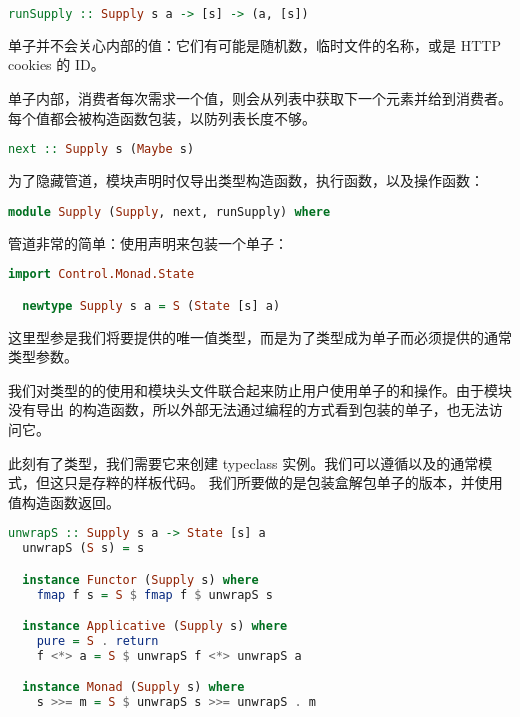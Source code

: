 \documentclass[./main.tex]{subfiles}
\begin{document}
\begin{lstlisting}[language=Haskell]
  runSupply :: Supply s a -> [s] -> (a, [s])
\end{lstlisting}

单子并不会关心内部的值：它们有可能是随机数，临时文件的名称，或是 HTTP cookies 的 ID。

单子内部，消费者每次需求一个值，则会从列表中获取下一个元素并给到消费者。每个值都会被构造函数包装，以防列表长度不够。

\begin{lstlisting}[language=Haskell]
  next :: Supply s (Maybe s)
\end{lstlisting}

为了隐藏管道，模块声明时仅导出类型构造函数，执行函数，以及操作函数：

\begin{lstlisting}[language=Haskell]
  module Supply (Supply, next, runSupply) where
\end{lstlisting}

管道非常的简单：使用声明来包装一个单子：

\begin{lstlisting}[language=Haskell]
  import Control.Monad.State

  newtype Supply s a = S (State [s] a)
\end{lstlisting}

这里型参是我们将要提供的唯一值类型，而是为了类型成为单子而必须提供的通常类型参数。

我们对类型的的使用和模块头文件联合起来防止用户使用单子的和操作。由于模块没有导出
的构造函数，所以外部无法通过编程的方式看到包装的单子，也无法访问它。

此刻有了类型，我们需要它来创建 typeclass 实例。我们可以遵循\acode{(>>=)}以及的通常模式，但这只是存粹的样板代码。
我们所要做的是包装盒解包单子的\acode{(>>=)}版本，并使用值构造函数返回。

\begin{lstlisting}[language=Haskell]
  unwrapS :: Supply s a -> State [s] a
  unwrapS (S s) = s

  instance Functor (Supply s) where
    fmap f s = S $ fmap f $ unwrapS s

  instance Applicative (Supply s) where
    pure = S . return
    f <*> a = S $ unwrapS f <*> unwrapS a

  instance Monad (Supply s) where
    s >>= m = S $ unwrapS s >>= unwrapS . m
\end{lstlisting}
\end{document}
